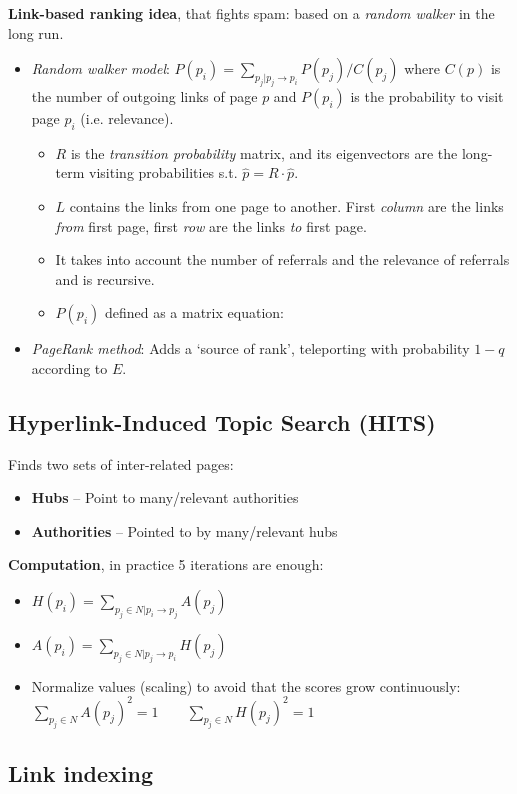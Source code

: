   \textbf{Link-based ranking idea}, that fights spam: based on a \emph{random walker} in the long run.
  \begin{itemize}
    \item \emph{Random walker model}: $P(p_i) = \sum_{p_j|p_j\rightarrow p_i}{P(p_j)/C(p_j)}$ where $C(p)$ is the number of outgoing links of page $p$ and $P(p_i)$ is the probability to visit page $p_i$ (i.e. relevance).
    \begin{itemize}
      \item $R$ is the \emph{transition probability} matrix, and its eigenvectors are the long-term visiting probabilities s.t. $\hat{p}=R\cdot \hat{p}$.
      \item $L$ contains the links from one page to another. First \emph{column} are the links \emph{from} first page, first \emph{row} are the links \emph{to} first page.
      \item It takes into account the number of referrals and the relevance of referrals and is recursive.
      \item $P(p_i)$ defined as a matrix equation: 
    \end{itemize}
    \item \emph{PageRank method}: Adds a `source of rank', teleporting with probability $1-q$ according to $E$. 
  \end{itemize}

\subsection{Hyperlink-Induced Topic Search (HITS)} %
\label{sub:hyperlink_induced_topic_search_hits}
  Finds two sets of inter-related pages:
  \begin{itemize}
    \item \textbf{Hubs} -- Point to many/relevant authorities
    \item \textbf{Authorities} -- Pointed to by many/relevant hubs
  \end{itemize}

  \textbf{Computation}, in practice 5 iterations are enough:
  \begin{itemize}
    \item $H(p_i) = \sum_{p_j \in N | p_i\rightarrow p_j}{A(p_j)}$
    \item $A(p_i) = \sum_{p_j \in N | p_j\rightarrow p_i}{H(p_j)}$
    \item Normalize values (scaling) to avoid that the scores grow continuously:\\ $\sum_{p_j\in N}{A(p_j)^2}=1 \qquad \sum_{p_j\in N}{H(p_j)^2}=1$
  \end{itemize}


\subsection{Link indexing} %
\label{sub:link_indexing}
